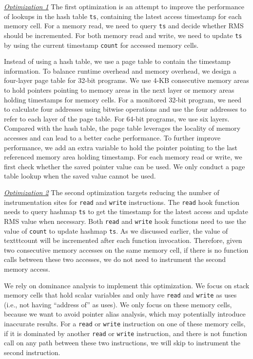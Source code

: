 {\underline{\textit{Optimization 1}}
The first optimization is an attempt to improve the performance of 
lookups in the hash table \texttt{ts}, 
containing the latest access timestamp for each memory cell.
For a memory read, 
we need to query \texttt{ts} and decide 
whether RMS should be incremented.
For both memory read and write, 
we need to update \texttt{ts} by using the current timestamp \texttt{count}
for accessed memory cells. 

Instead of using a hash table, 
we use a page table to contain the timestamp information. 
To balance runtime overhead and memory overhead, 
we design a four-layer page table for 32-bit programs.
We use 4-KB consecutive memory areas to hold pointers pointing to 
memory areas in the next layer 
or memory areas holding timestamps for memory cells. 
For a monitored 32-bit program, 
we need to calculate four addresses using bitwise operations 
and use the four addresses to refer to each layer of the page table.  
For 64-bit programs, we use six layers.  
Compared with the hash table, 
the page table leverages the locality of memory accesses 
and can lead 
to a better cache performance. 
To further improve performance, 
we add an extra variable to hold the pointer pointing 
to the last referenced memory area holding timestamp.
For each memory read or write, 
we first check whether the saved pointer value can be used. 
We only conduct a page table lookup when the saved value cannot be used. 

{\underline{\textit{Optimization 2}}
The second optimization targets reducing the number of instrumentation sites 
for \texttt{read} and \texttt{write} instructions. 
The \texttt{read} hook function needs to query hashmap \texttt{ts} 
to get the timestamp for the latest access and update RMS value when necessary. 
Both \texttt{read} and \texttt{write} hook functions 
need to use the value of \texttt{count} to update hashmap \texttt{ts}.
As we discussed earlier, the value of texttt{count} will be incremented after each function invocation. 
Therefore, given two consecutive memory accesses on the same memory cell,
if there is no function calls between these two accesses, 
we do not need to instrument the second memory access. 

We rely on dominance analysis to implement this optimization. 
We focus on stack memory cells that hold 
scalar variables and only have \texttt{read} and \texttt{write} as uses 
(i.e., not having ``address of'' as uses).
We only focus on these memory cells,
because we want to avoid pointer alias analysis, 
which may potentially introduce inaccurate results. 
For a \texttt{read} or \texttt{write} instruction on one of these memory cells,
if it is dominated by another \texttt{read} or \texttt{write} instruction, 
and there is not function call on any path between these two instructions,
we will skip to instrument the second instruction.  



}}
